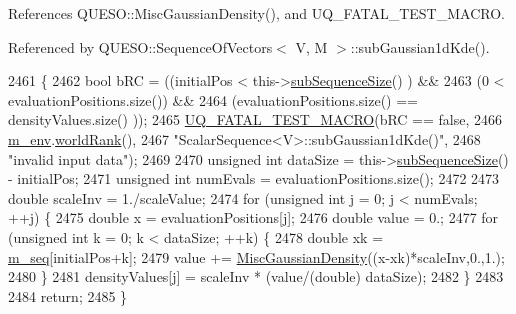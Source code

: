References Q\-U\-E\-S\-O\-::\-Misc\-Gaussian\-Density(), and U\-Q\-\_\-\-F\-A\-T\-A\-L\-\_\-\-T\-E\-S\-T\-\_\-\-M\-A\-C\-R\-O.



Referenced by Q\-U\-E\-S\-O\-::\-Sequence\-Of\-Vectors$<$ V, M $>$\-::sub\-Gaussian1d\-Kde().


\begin{DoxyCode}
2461 \{
2462   \textcolor{keywordtype}{bool} bRC = ((initialPos                 <  this->\hyperlink{class_q_u_e_s_o_1_1_scalar_sequence_a0288ea295eedc216a1617b3286f6f3a0}{subSequenceSize}()   ) &&
2463               (0                          <  evaluationPositions.size()) &&
2464               (evaluationPositions.size() == densityValues.size()      ));
2465   \hyperlink{_defines_8h_a56d63d18d0a6d45757de47fcc06f574d}{UQ\_FATAL\_TEST\_MACRO}(bRC == \textcolor{keyword}{false},
2466                       \hyperlink{class_q_u_e_s_o_1_1_scalar_sequence_a71618cd6351b29361b437af68447a4c8}{m\_env}.\hyperlink{class_q_u_e_s_o_1_1_base_environment_a78b57112bbd0e6dd0e8afec00b40ffa7}{worldRank}(),
2467                       \textcolor{stringliteral}{"ScalarSequence<V>::subGaussian1dKde()"},
2468                       \textcolor{stringliteral}{"invalid input data"});
2469 
2470   \textcolor{keywordtype}{unsigned} \textcolor{keywordtype}{int} dataSize = this->\hyperlink{class_q_u_e_s_o_1_1_scalar_sequence_a0288ea295eedc216a1617b3286f6f3a0}{subSequenceSize}() - initialPos;
2471   \textcolor{keywordtype}{unsigned} \textcolor{keywordtype}{int} numEvals = evaluationPositions.size();
2472 
2473   \textcolor{keywordtype}{double} scaleInv = 1./scaleValue;
2474   \textcolor{keywordflow}{for} (\textcolor{keywordtype}{unsigned} \textcolor{keywordtype}{int} j = 0; j < numEvals; ++j) \{
2475     \textcolor{keywordtype}{double} x = evaluationPositions[j];
2476     \textcolor{keywordtype}{double} value = 0.;
2477     \textcolor{keywordflow}{for} (\textcolor{keywordtype}{unsigned} \textcolor{keywordtype}{int} k = 0; k < dataSize; ++k) \{
2478       \textcolor{keywordtype}{double} xk = \hyperlink{class_q_u_e_s_o_1_1_scalar_sequence_ae616036fd2e62fb69df167814545e893}{m\_seq}[initialPos+k];
2479       value += \hyperlink{namespace_q_u_e_s_o_a0f94e9b1e8f415c389f180d4a75c5591}{MiscGaussianDensity}((x-xk)*scaleInv,0.,1.);
2480     \}
2481     densityValues[j] = scaleInv * (value/(double) dataSize);
2482   \}
2483 
2484   \textcolor{keywordflow}{return};
2485 \}
\end{DoxyCode}
